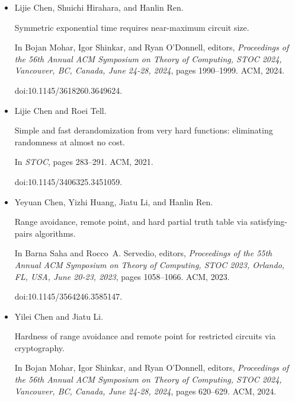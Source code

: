 \begin{itemize}
In \emph{21st Annual IEEE Conference on Computational Complexity
(CCC 2006), 16-20 July 2006, Prague, Czech Republic}, pages 73–87. IEEE
Computer Society, 2006.


doi:10.1109/CCC.2006.26.





\item[] 
[5]

Lijie Chen, Shuichi Hirahara, and Hanlin Ren.


Symmetric exponential time requires near-maximum circuit size.


In Bojan Mohar, Igor Shinkar, and Ryan O’Donnell, editors, \emph{Proceedings of the 56th Annual ACM Symposium on Theory of Computing, STOC
2024, Vancouver, BC, Canada, June 24-28, 2024}, pages 1990–1999. ACM,
2024.


doi:10.1145/3618260.3649624.





\item[] 
[6]

Lijie Chen and Roei Tell.


Simple and fast derandomization from very hard functions: eliminating
randomness at almost no cost.


In \emph{STOC}, pages 283–291. ACM, 2021.


doi:10.1145/3406325.3451059.





\item[] 
[7]

Yeyuan Chen, Yizhi Huang, Jiatu Li, and Hanlin Ren.


Range avoidance, remote point, and hard partial truth table via
satisfying-pairs algorithms.


In Barna Saha and Rocco A. Servedio, editors, \emph{Proceedings of the
55th Annual ACM Symposium on Theory of Computing, STOC 2023, Orlando, FL,
USA, June 20-23, 2023}, pages 1058–1066. ACM, 2023.


doi:10.1145/3564246.3585147.





\item[] 
[8]

Yilei Chen and Jiatu Li.


Hardness of range avoidance and remote point for restricted circuits
via cryptography.


In Bojan Mohar, Igor Shinkar, and Ryan O’Donnell, editors, \emph{Proceedings of the 56th Annual ACM Symposium on Theory of Computing, STOC
2024, Vancouver, BC, Canada, June 24-28, 2024}, pages 620–629. ACM, 2024.



\end{itemize}
